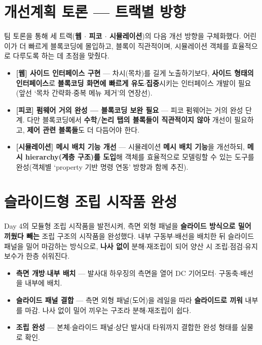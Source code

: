 \section{개선계획 토론 — 트랙별 방향}
팀 토론을 통해 세 트랙(\textbf{웹 $\cdot$ 피코 $\cdot$ 시뮬레이션})의 다음 개선 방향을
구체화했다. 어린이가 더 빠르게 블록코딩에 몰입하고, 블록이 직관적이며, 시뮬레이션
객체를 효율적으로 다루도록 하는 데 초점을 맞췄다.

\begin{itemize}
  \item \textbf{[웹] 사이드 인터페이스 구현} — 차시(목차)를 길게 노출하기보다,
  \textbf{사이드 형태의 인터페이스}로 \textbf{블록코딩 화면에 빠르게 유도$\cdot$집중}시키는
  인터페이스 개발이 필요(앞선 ‘목차 간략화$\cdot$중복 메뉴 제거’의 연장선).
  \item \textbf{[피코] 펌웨어 거의 완성 --- 블록코딩 보완 필요} — 피코 펌웨어는 거의
  완성 단계. 다만 블록코딩에서 \textbf{수학/논리 탭의 블록들이 직관적이지 않아} 개선이
  필요하고, \textbf{제어 관련 블록들}도 더 다듬어야 한다.
  \item \textbf{[시뮬레이션] 메시 배치 기능 개선} — 시뮬레이션 \textbf{메시 배치 기능}을
  개선하되, \textbf{메시 hierarchy(계층 구조)를 도입}해 객체를 효율적으로 모델링할 수
  있는 도구를 완성(객체별 ‘property 기반 명령 연동’ 방향과 함께 추진).
\end{itemize}

\section{슬라이드형 조립 시작품 완성}
Day 4의 모듈형 조립 시작품을 발전시켜, 측면 외형 패널을 \textbf{슬라이드 방식으로 밀어
끼웠다 빼는} 조립 구조의 시작품을 완성했다. 내부 구동부$\cdot$배선을 배치한 뒤 슬라이드
패널을 밀어 마감하는 방식으로, \textbf{나사 없이} 분해$\cdot$재조립이 되어 양산 시
조립$\cdot$점검$\cdot$유지보수가 한층 쉬워진다.

\begin{itemize}
  \item \textbf{측면 개방$\cdot$내부 배치} — 발사대 하우징의 측면을 열어 DC 기어모터$\cdot$%
  구동축$\cdot$배선을 내부에 배치.
  \item \textbf{슬라이드 패널 결합} — 측면 외형 패널(도어)을 레일을 따라 \textbf{슬라이드로
  끼워} 내부를 마감. 나사 없이 밀어 끼우는 구조라 분해$\cdot$재조립이 쉽다.
  \item \textbf{조립 완성} — 본체$\cdot$슬라이드 패널$\cdot$상단 발사대 타워까지 결합한 완성
  형태를 실물로 확인.
\end{itemize}

